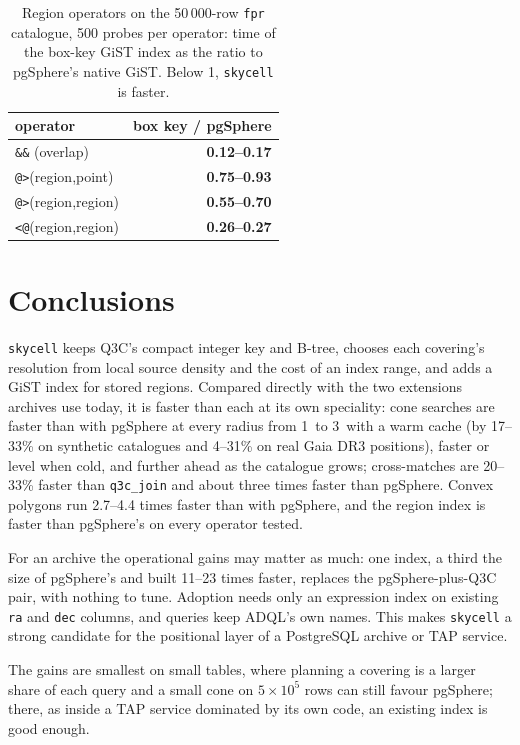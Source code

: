 \begin{table}
  \caption{Region operators on the 50\,000-row \texttt{fpr} catalogue, 500 probes per
    operator: time of the box-key GiST index as the ratio to pgSphere's native GiST.
    Below 1, \texttt{skycell} is faster.}
  \label{tab:gistregion}
  \centering
  \footnotesize
  \begin{tabular}{l r}
    \hline\hline
    operator & box key / pgSphere \\
    \hline
    \texttt{\&\&} (overlap) & \textbf{0.12--0.17} \\
    \texttt{@>}(region,point) & \textbf{0.75--0.93} \\
    \texttt{@>}(region,region) & \textbf{0.55--0.70} \\
    \texttt{<@}(region,region) & \textbf{0.26--0.27} \\
    \hline
  \end{tabular}
\end{table}

\section{Conclusions}
\label{sec:conclusions}

\texttt{skycell} keeps Q3C's compact integer key and B-tree, chooses each covering's
resolution from local source density and the cost of an index range, and adds a GiST
index for stored regions. Compared directly with the two extensions archives use today,
it is faster than each at its own speciality: cone searches are faster than with
pgSphere at every radius from 1\arcsec\ to 3\degr\ with a warm cache (by 17--33\% on
synthetic catalogues and 4--31\% on real Gaia DR3 positions), faster or level when cold,
and further ahead as the catalogue grows; cross-matches are 20--33\% faster than
\texttt{q3c\_join} and about three times faster than pgSphere. Convex polygons run
2.7--4.4 times faster than with pgSphere, and the region index is faster than
pgSphere's on every operator tested.

For an archive the operational gains may matter as much: one index, a third the size of
pgSphere's and built 11--23 times faster, replaces the pgSphere-plus-Q3C pair, with
nothing to tune. Adoption needs only an expression index on existing \texttt{ra} and
\texttt{dec} columns, and queries keep ADQL's own names. This makes \texttt{skycell} a
strong candidate for the positional layer of a PostgreSQL archive or TAP service.

The gains are smallest on small tables, where planning a covering is a larger share of
each query and a small cone on $5\times10^5$ rows can still favour pgSphere; there, as
inside a TAP service dominated by its own code, an existing index is good enough.
